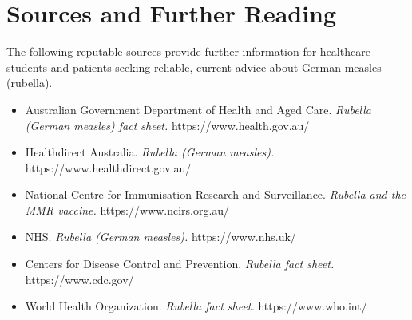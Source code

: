 \section*{Sources and Further Reading}
The following reputable sources provide further information for healthcare students and patients seeking reliable, current advice about German measles (rubella).

\begin{itemize}
    \item Australian Government Department of Health and Aged Care. \textit{Rubella (German measles) fact sheet.} https://www.health.gov.au/
    \item Healthdirect Australia. \textit{Rubella (German measles).} https://www.healthdirect.gov.au/
    \item National Centre for Immunisation Research and Surveillance. \textit{Rubella and the MMR vaccine.} https://www.ncirs.org.au/
    \item NHS. \textit{Rubella (German measles).} https://www.nhs.uk/
    \item Centers for Disease Control and Prevention. \textit{Rubella fact sheet.} https://www.cdc.gov/
    \item World Health Organization. \textit{Rubella fact sheet.} https://www.who.int/
\end{itemize}
